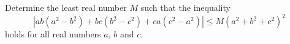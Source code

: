 Determine the least real number $M$ such that the inequality \[|ab(a^{2}-b^{2})+bc(b^{2}-c^{2})+ca(c^{2}-a^{2})| \leq M(a^{2}+b^{2}+c^{2})^{2}\] holds for all real numbers $a$,  $b$ and $c$.